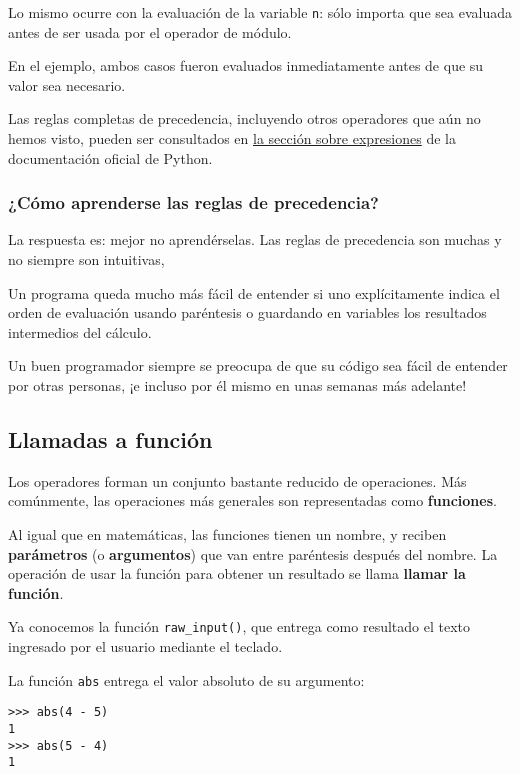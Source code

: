 Lo mismo ocurre con la evaluación de la variable \lstinline!n!: sólo
importa que sea evaluada antes de ser usada por el operador de módulo.

En el ejemplo, ambos casos fueron evaluados inmediatamente antes de que
su valor sea necesario.

Las reglas completas de precedencia, incluyendo otros operadores que aún
no hemos visto, pueden ser consultados en
\href{http://docs.python.org/reference/expressions.html\#summary}{la
sección sobre expresiones} de la documentación oficial de Python.

\subsubsection{¿Cómo aprenderse las reglas de precedencia?}

La respuesta es: mejor no aprendérselas. Las reglas de precedencia son
muchas y no siempre son intuitivas,

Un programa queda mucho más fácil de entender si uno explícitamente
indica el orden de evaluación usando paréntesis o guardando en variables
los resultados intermedios del cálculo.

Un buen programador siempre se preocupa de que su código sea fácil de
entender por otras personas, ¡e incluso por él mismo en unas semanas más
adelante!

\subsection{Llamadas a función}

Los operadores forman un conjunto bastante reducido de operaciones. Más
comúnmente, las operaciones más generales son representadas como
\textbf{funciones}.

Al igual que en matemáticas, las funciones tienen un nombre, y reciben
\textbf{parámetros} (o \textbf{argumentos}) que van entre paréntesis
después del nombre. La operación de usar la función para obtener un
resultado se llama \textbf{llamar la función}.

Ya conocemos la función \lstinline!raw_input()!, que entrega como
resultado el texto ingresado por el usuario mediante el teclado.

La función \lstinline!abs! entrega el valor absoluto de su argumento:

\begin{lstlisting}
>>> abs(4 - 5)
1
>>> abs(5 - 4)
1
\end{lstlisting}

